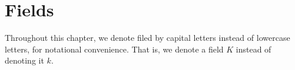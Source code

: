 \chapter{Fields}
\label{chapter_4}

Throughout this chapter, we denote filed by capital letters instead of
lowercase letters, for notational convenience. That is, we denote a
field $K$ instead of denoting it $k$.



%




